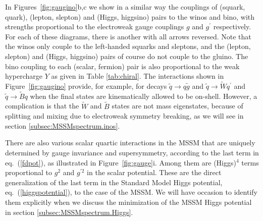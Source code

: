 \documentclass[12pt]{article}
\def\stilde{\widetilde}
\begin{document}
In Figures~\ref{fig:gaugino}b,c we
show in a similar way the couplings of (squark, quark), (lepton, slepton)
and (Higgs, higgsino) pairs to the winos and bino, with strengths
proportional to the electroweak gauge couplings $g$ and $g^\prime$
respectively. For each of these diagrams, there is another with all arrows
reversed. Note that the winos only couple to the left-handed squarks and
sleptons, and the (lepton, slepton) and (Higgs, higgsino) pairs of course
do not couple to the gluino. The bino coupling to each (scalar, fermion)
pair is also proportional to the weak hypercharge $Y$ as 
given in Table \ref{tab:chiral}.
The interactions shown in Figure~\ref{fig:gaugino} provide, for example,
for decays $\stilde q \rightarrow q\stilde g$ and $\stilde q \rightarrow
\stilde W q^\prime$ and $\stilde q \rightarrow \stilde B q$ when the final
states are kinematically allowed to be on-shell. However, a complication
is that the $\stilde W$ and $\stilde B$ states are not mass eigenstates,
because of splitting and mixing due to electroweak symmetry breaking, as
we will see in section \ref{subsec:MSSMspectrum.inos}. 

There are also various scalar quartic interactions in the MSSM that are
uniquely determined by gauge invariance and supersymmetry, according to
the last term in eq.~(\ref{fdpot}), as illustrated in
Figure~\ref{fig:gauge}i. Among them are (Higgs)$^4$ terms proportional to
$g^2$ and $g^{\prime 2}$ in the scalar potential. These are the direct
generalization of the last term in the Standard Model Higgs potential,
eq.~(\ref{higgspotential}), to the case of the MSSM. We will have occasion
to identify them explicitly when we discuss the minimization of the MSSM
Higgs potential in section \ref{subsec:MSSMspectrum.Higgs}. 
\end{document}

